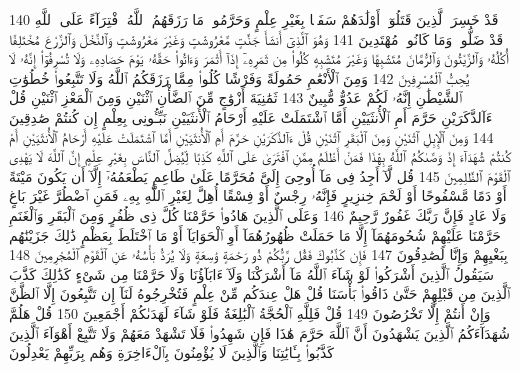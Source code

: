 {\tiny\colorbox{cl_aya}{140}} قَدْ خَسِرَ ٱلَّذِينَ قَتَلُوٓا۟ أَوْلَٰدَهُمْ سَفَهًۢا بِغَيْرِ عِلْمٍ وَحَرَّمُوا۟ مَا رَزَقَهُمُ ٱللَّهُ ٱفْتِرَآءً عَلَى ٱللَّهِ قَدْ ضَلُّوا۟ وَمَا كَانُوا۟ مُهْتَدِينَ
{\tiny\colorbox{cl_aya}{141}} وَهُوَ ٱلَّذِىٓ أَنشَأَ جَنَّٰتٍ مَّعْرُوشَٰتٍ وَغَيْرَ مَعْرُوشَٰتٍ وَٱلنَّخْلَ وَٱلزَّرْعَ مُخْتَلِفًا أُكُلُهُۥ وَٱلزَّيْتُونَ وَٱلرُّمَّانَ مُتَشَٰبِهًا وَغَيْرَ مُتَشَٰبِهٍ كُلُوا۟ مِن ثَمَرِهِۦٓ إِذَآ أَثْمَرَ وَءَاتُوا۟ حَقَّهُۥ يَوْمَ حَصَادِهِۦ وَلَا تُسْرِفُوٓا۟ إِنَّهُۥ لَا يُحِبُّ ٱلْمُسْرِفِينَ
{\tiny\colorbox{cl_aya}{142}} وَمِنَ ٱلْأَنْعَٰمِ حَمُولَةً وَفَرْشًا كُلُوا۟ مِمَّا رَزَقَكُمُ ٱللَّهُ وَلَا تَتَّبِعُوا۟ خُطُوَٰتِ ٱلشَّيْطَٰنِ إِنَّهُۥ لَكُمْ عَدُوٌّ مُّبِينٌ
{\tiny\colorbox{cl_aya}{143}} ثَمَٰنِيَةَ أَزْوَٰجٍ مِّنَ ٱلضَّأْنِ ٱثْنَيْنِ وَمِنَ ٱلْمَعْزِ ٱثْنَيْنِ قُلْ ءَآلذَّكَرَيْنِ حَرَّمَ أَمِ ٱلْأُنثَيَيْنِ أَمَّا ٱشْتَمَلَتْ عَلَيْهِ أَرْحَامُ ٱلْأُنثَيَيْنِ نَبِّـُٔونِى بِعِلْمٍ إِن كُنتُمْ صَٰدِقِينَ
{\tiny\colorbox{cl_aya}{144}} وَمِنَ ٱلْإِبِلِ ٱثْنَيْنِ وَمِنَ ٱلْبَقَرِ ٱثْنَيْنِ قُلْ ءَآلذَّكَرَيْنِ حَرَّمَ أَمِ ٱلْأُنثَيَيْنِ أَمَّا ٱشْتَمَلَتْ عَلَيْهِ أَرْحَامُ ٱلْأُنثَيَيْنِ أَمْ كُنتُمْ شُهَدَآءَ إِذْ وَصَّىٰكُمُ ٱللَّهُ بِهَٰذَا فَمَنْ أَظْلَمُ مِمَّنِ ٱفْتَرَىٰ عَلَى ٱللَّهِ كَذِبًا لِّيُضِلَّ ٱلنَّاسَ بِغَيْرِ عِلْمٍ إِنَّ ٱللَّهَ لَا يَهْدِى ٱلْقَوْمَ ٱلظَّٰلِمِينَ
{\tiny\colorbox{cl_aya}{145}} قُل لَّآ أَجِدُ فِى مَآ أُوحِىَ إِلَىَّ مُحَرَّمًا عَلَىٰ طَاعِمٍ يَطْعَمُهُۥٓ إِلَّآ أَن يَكُونَ مَيْتَةً أَوْ دَمًا مَّسْفُوحًا أَوْ لَحْمَ خِنزِيرٍ فَإِنَّهُۥ رِجْسٌ أَوْ فِسْقًا أُهِلَّ لِغَيْرِ ٱللَّهِ بِهِۦ فَمَنِ ٱضْطُرَّ غَيْرَ بَاغٍ وَلَا عَادٍ فَإِنَّ رَبَّكَ غَفُورٌ رَّحِيمٌ
{\tiny\colorbox{cl_aya}{146}} وَعَلَى ٱلَّذِينَ هَادُوا۟ حَرَّمْنَا كُلَّ ذِى ظُفُرٍ وَمِنَ ٱلْبَقَرِ وَٱلْغَنَمِ حَرَّمْنَا عَلَيْهِمْ شُحُومَهُمَآ إِلَّا مَا حَمَلَتْ ظُهُورُهُمَآ أَوِ ٱلْحَوَايَآ أَوْ مَا ٱخْتَلَطَ بِعَظْمٍ ذَٰلِكَ جَزَيْنَٰهُم بِبَغْيِهِمْ وَإِنَّا لَصَٰدِقُونَ
{\tiny\colorbox{cl_aya}{147}} فَإِن كَذَّبُوكَ فَقُل رَّبُّكُمْ ذُو رَحْمَةٍ وَٰسِعَةٍ وَلَا يُرَدُّ بَأْسُهُۥ عَنِ ٱلْقَوْمِ ٱلْمُجْرِمِينَ
{\tiny\colorbox{cl_aya}{148}} سَيَقُولُ ٱلَّذِينَ أَشْرَكُوا۟ لَوْ شَآءَ ٱللَّهُ مَآ أَشْرَكْنَا وَلَآ ءَابَآؤُنَا وَلَا حَرَّمْنَا مِن شَىْءٍ كَذَٰلِكَ كَذَّبَ ٱلَّذِينَ مِن قَبْلِهِمْ حَتَّىٰ ذَاقُوا۟ بَأْسَنَا قُلْ هَلْ عِندَكُم مِّنْ عِلْمٍ فَتُخْرِجُوهُ لَنَآ إِن تَتَّبِعُونَ إِلَّا ٱلظَّنَّ وَإِنْ أَنتُمْ إِلَّا تَخْرُصُونَ
{\tiny\colorbox{cl_aya}{149}} قُلْ فَلِلَّهِ ٱلْحُجَّةُ ٱلْبَٰلِغَةُ فَلَوْ شَآءَ لَهَدَىٰكُمْ أَجْمَعِينَ
{\tiny\colorbox{cl_aya}{150}} قُلْ هَلُمَّ شُهَدَآءَكُمُ ٱلَّذِينَ يَشْهَدُونَ أَنَّ ٱللَّهَ حَرَّمَ هَٰذَا فَإِن شَهِدُوا۟ فَلَا تَشْهَدْ مَعَهُمْ وَلَا تَتَّبِعْ أَهْوَآءَ ٱلَّذِينَ كَذَّبُوا۟ بِـَٔايَٰتِنَا وَٱلَّذِينَ لَا يُؤْمِنُونَ بِٱلْءَاخِرَةِ وَهُم بِرَبِّهِمْ يَعْدِلُونَ
